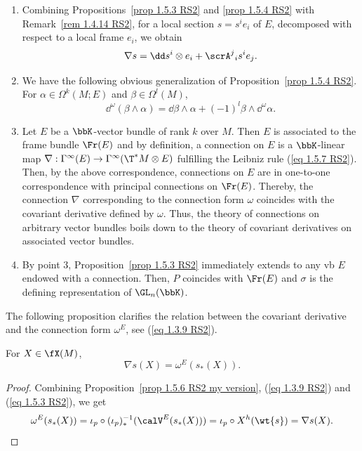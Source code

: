 \begin{rem}\label{rem 1.5.5 RS2}
    \begin{enumerate}
        \item Combining Propositions~\ref{prop 1.5.3 RS2} and \ref{prop 1.5.4 RS2} with Remark~\ref{rem 1.4.14 RS2}, for a local section $s=s^ie_i$ of $E$, decomposed with respect to a local frame $e_i$, we obtain
        \[\nabla s=\dd s^i\otimes e_i+\scrA^j{}_i s^i e_j.\label{eq 1.5.8 RS2}\]
        \item We have the following obvious generalization of Proposition~\ref{prop 1.5.4 RS2}. For $\alpha\in\Omega^k(M;E)$ and $\beta\in\Omega^l(M)$,
        \[\dd^\omega(\beta\wedge\alpha)=\dd\beta\wedge\alpha+(-1)^l\beta\wedge\dd^\omega \alpha.\]
        \item Let $E$ be a $\bbK$-vector bundle of rank $k$ over $M$. Then $E$ is associated to the frame bundle $\Fr(E)$ and by definition, a connection on $E$ is a $\bbK$-linear map $\nabla:\Gamma^\infty(E)\to \Gamma^\infty(\T^\ast M\otimes E)$ fulfilling the Leibniz rule (\ref{eq 1.5.7 RS2}). Then, by the above correspondence, connections on $E$ are in one-to-one correspondence with principal connections on $\Fr(E)$. Thereby, the connection $\nabla$ corresponding to the connection form $\omega$ coincides with the covariant derivative defined by $\omega$. Thus, the theory of connections on arbitrary vector bundles boils down to the theory of covariant derivatives on associated vector bundles.
        \item By point 3, Proposition~\ref{prop 1.5.3 RS2} immediately extends to any \gls{vb} $E$ endowed with a connection. Then, $P$ coincides with $\Fr(E)$ and $\sigma$ is the defining representation of $\GL_n(\bbK)$.
    \end{enumerate}
\end{rem}

The following proposition clarifies the relation between the covariant derivative and the connection form $\omega^E$, see (\ref{eq 1.3.9 RS2}).

\begin{prop}[{{\cite[Prop.~1.5.6]{RS2}}}]\label{prop 1.5.6 RS2}
    For $X\in\fX(M)$,
    \[\nabla s(X)=\omega^E(s_\ast(X)).\]
\end{prop}
\begin{proof}
    Combining Proposition~\ref{prop 1.5.6 RS2 my version}, (\ref{eq 1.3.9 RS2}) and (\ref{eq 1.5.3 RS2}), we get
    \[\omega^E(s_\ast(X))=\iota_p\circ (\iota_p)_\ast^{-1}(\calV^E(s_\ast(X)))=\iota_p\circ X^h(\wt{s})=\nabla s(X).\]
\end{proof}

